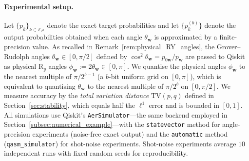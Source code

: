 \documentclass{article}
\newcommand{\RY}{\mathrm{R}_y}
\numberwithin{equation}{section}
\begin{document}
\paragraph{Experimental setup.}
Let $\{p_k\}_{k\in\mathbb{Z}_{2^n}}$ denote the exact target probabilities and let
$\{p_k^{(b)}\}$ denote the output probabilities obtained when each angle $\theta_{\mathbf{w}}$
is approximated by a finite-precision value.
As recalled in Remark~\ref{rem:physical_RY_angles}, the Grover--Rudolph angles
$\theta_{\mathbf{w}}\in[0,\pi/2]$ defined by $\cos^2\theta_{\mathbf{w}}=p_{0\mathbf{w}}/p_{\mathbf{w}}$
are passed to Qiskit as physical $\RY$ angles $\phi_{\mathbf{w}}:=2\theta_{\mathbf{w}}\in[0,\pi]$.
We quantise the physical angles $\phi_{\mathbf{w}}$ to the nearest multiple of
$\pi/2^{b-1}$ (a $b$-bit uniform grid on $[0,\pi]$), which is equivalent to quantising
$\theta_{\mathbf{w}}$ to the nearest multiple of $\pi/2^b$ on $[0,\pi/2]$.
We measure accuracy by the \emph{total variation distance} $\mathrm{TV}(p,q)$
defined in Section~\ref{sec:stability},
which equals half the $\ell^1$ error and is bounded in $[0,1]$.
All simulations use Qiskit's \texttt{AerSimulator}---the same backend employed in
Section~\ref{subsec:numerical_example}---with the \texttt{statevector} method for
angle-precision experiments (noise-free exact output) and the \texttt{automatic}
method (\texttt{qasm\_simulator}) for shot-noise experiments.
Shot-noise experiments average $10$ independent runs with fixed random seeds for reproducibility.
\end{document}
